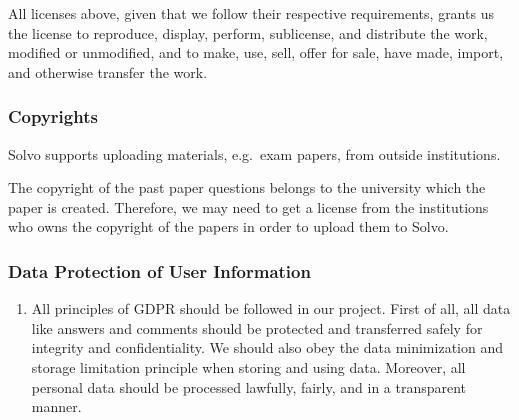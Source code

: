\documentclass[a4paper]{article}
\begin{document}
    All licenses above, given that we follow their respective requirements, grants us the license to reproduce, display, perform, sublicense, and distribute the work, modified or unmodified, and to make, use, sell, offer for sale, have made, import, and otherwise transfer the work.

    \subsubsection*{Copyrights}

    Solvo supports uploading materials, e.g.\ exam papers, from outside institutions.

    The copyright of the past paper questions belongs to the university which the paper is created.
    Therefore, we may need to get a license from the institutions who owns the copyright of the papers in order to upload them to Solvo.

    \subsubsection*{Data Protection of User Information}
    \begin{enumerate}
        \item All principles of GDPR should be followed in our project.
        First of all, all data like answers and comments should be protected and transferred safely for integrity and confidentiality.
        We should also obey the data minimization and storage limitation principle when storing and using data.
        Moreover, all personal data should be processed lawfully, fairly, and in a transparent manner.
    \end{enumerate}
\end{document}
